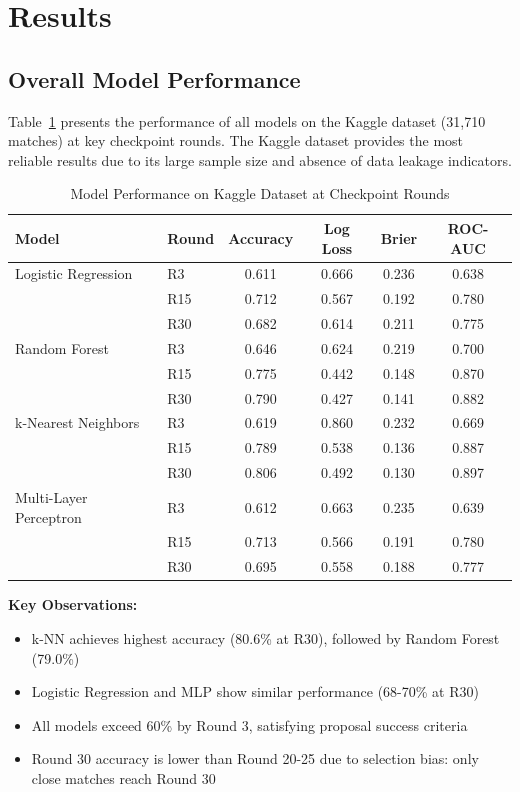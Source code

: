 \documentclass[11pt]{article}
\begin{document}
\section{Results}
\label{sec:results}

\subsection{Overall Model Performance}

Table~\ref{tab:kaggle_performance} presents the performance of all models on the Kaggle dataset (31,710 matches) at key checkpoint rounds. The Kaggle dataset provides the most reliable results due to its large sample size and absence of data leakage indicators.

\begin{table}[h]
\centering
\caption{Model Performance on Kaggle Dataset at Checkpoint Rounds}
\label{tab:kaggle_performance}
\small
\begin{tabular}{llcccc}
\toprule
\textbf{Model} & \textbf{Round} & \textbf{Accuracy} & \textbf{Log Loss} & \textbf{Brier} & \textbf{ROC-AUC} \\
\midrule
Logistic Regression & R3 & 0.611 & 0.666 & 0.236 & 0.638 \\
 & R15 & 0.712 & 0.567 & 0.192 & 0.780 \\
 & R30 & 0.682 & 0.614 & 0.211 & 0.775 \\
\midrule
Random Forest & R3 & 0.646 & 0.624 & 0.219 & 0.700 \\
 & R15 & 0.775 & 0.442 & 0.148 & 0.870 \\
 & R30 & 0.790 & 0.427 & 0.141 & 0.882 \\
\midrule
k-Nearest Neighbors & R3 & 0.619 & 0.860 & 0.232 & 0.669 \\
 & R15 & 0.789 & 0.538 & 0.136 & 0.887 \\
 & R30 & 0.806 & 0.492 & 0.130 & 0.897 \\
\midrule
Multi-Layer Perceptron & R3 & 0.612 & 0.663 & 0.235 & 0.639 \\
 & R15 & 0.713 & 0.566 & 0.191 & 0.780 \\
 & R30 & 0.695 & 0.558 & 0.188 & 0.777 \\
\bottomrule
\end{tabular}
\end{table}

\textbf{Key Observations:}
\begin{itemize}
    \item k-NN achieves highest accuracy (80.6\% at R30), followed by Random Forest (79.0\%)
    \item Logistic Regression and MLP show similar performance (68-70\% at R30)
    \item All models exceed 60\% by Round 3, satisfying proposal success criteria
    \item Round 30 accuracy is lower than Round 20-25 due to selection bias: only close matches reach Round 30
\end{itemize}
\end{document}
